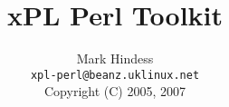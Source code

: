 \documentclass[12pt,a4paper]{article}
\title{xPL Perl Toolkit}
\author{Mark Hindess\\
  \texttt{xpl-perl@beanz.uklinux.net}\\
  Copyright (C) 2005, 2007}
\begin{document}
\newcommand{\comment}[1]{}
\setlength{\parindent}{0pt}
\addtolength{\parskip}{5pt}

\def\href#1#2{\special{html:<a href="#1">}{#2}\special{html:</a>}}
\def\url#1{\special{html:<a href="#1">}{\tt{#1}}\special{html:</a>}}
\def\msg#1{\texttt{#1}}
\def\method#1{\texttt{#1}}
\def\field#1{\texttt{#1}}
\def\cmd#1{\texttt{#1}}

\maketitle
\newpage
\tableofcontents
\end{document}
